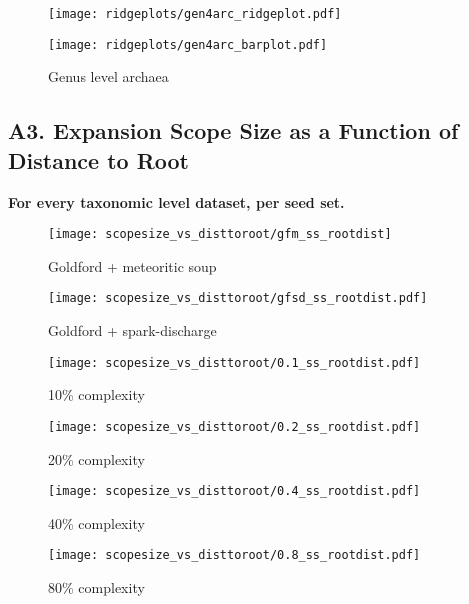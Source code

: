 \begin{figure}[H]
    \centering
    \texttt{[image: ridgeplots/gen4arc\_ridgeplot.pdf]}
    \label{ridgeplot_gen4arc}
\end{figure}

\begin{figure}[H]
    \centering
    \texttt{[image: ridgeplots/gen4arc\_barplot.pdf]}
    \caption[]{Genus level archaea}
    \label{barplot_gen4arc}
\end{figure}



\subsection*{A3. Expansion Scope Size as a Function of Distance to Root}
\textbf{For every taxonomic level dataset, per seed set.}

\begin{figure}[H]
    \centering
    \texttt{[image: scopesize\_vs\_disttoroot/gfm\_ss\_rootdist]}
    \caption{Goldford + meteoritic soup}
    \label{gfm_scopesize}
\end{figure}   

\begin{figure}[H]
    \centering
    \texttt{[image: scopesize\_vs\_disttoroot/gfsd\_ss\_rootdist.pdf]}
    \caption{Goldford + spark-discharge}
    \label{gfsd_scopesize}
\end{figure}   

\begin{figure}[H]
    \centering
    \texttt{[image: scopesize\_vs\_disttoroot/0.1\_ss\_rootdist.pdf]}
    \caption{10\% complexity}
    \label{0.1_scopesize}
\end{figure}   

\begin{figure}[H]
    \centering
    \texttt{[image: scopesize\_vs\_disttoroot/0.2\_ss\_rootdist.pdf]}
    \caption{20\% complexity}
    \label{0.2_scopesize}
\end{figure}   

\begin{figure}[H]
    \centering
    \texttt{[image: scopesize\_vs\_disttoroot/0.4\_ss\_rootdist.pdf]}
    \caption{40\% complexity}
    \label{0.4_scopesize}
\end{figure}   

\begin{figure}[H]
    \centering
    \texttt{[image: scopesize\_vs\_disttoroot/0.8\_ss\_rootdist.pdf]}
    \caption{80\% complexity}
    \label{0.8_scopesize}
\end{figure}   

